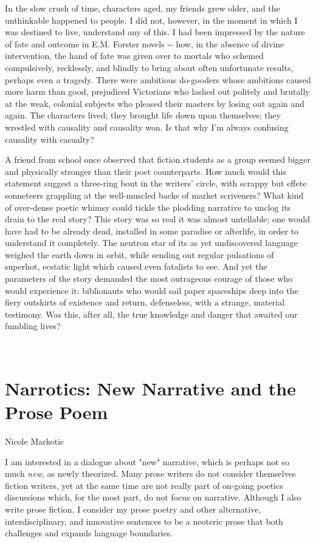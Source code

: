 In the slow crush of time, characters aged, my friends grew older, and
the unthinkable happened to people. I did not, however, in the moment in
which I was destined to live, understand any of this. I had been
impressed by the nature of fate and outcome in E.M. Forster novels -\/-
how, in the absence of divine intervention, the hand of fate was given
over to mortals who schemed compulsively, recklessly, and blindly to
bring about often unfortunate results, perhaps even a tragedy. There
were ambitious do-gooders whose ambitions caused more harm than good,
prejudiced Victorians who lashed out politely and brutally at the weak,
colonial subjects who pleased their masters by losing out again and
again. The characters lived; they brought life down upon themselves;
they wrestled with causality and causality won. Is that why I'm always
confusing causality with casualty?

A friend from school once observed that fiction students as a group
seemed bigger and physically stronger than their poet counterparts. How
much would this statement suggest a three-ring bout in the writers'
circle, with scrappy but effete sonneteers grappling at the well-muscled
backs of market scriveners? What kind of over-dense poetic whimsy could
tickle the plodding narrative to unclog its drain to the real story?
This story was so real it was almost untellable; one would have had to
be already dead, installed in some paradise or afterlife, in order to
understand it completely. The neutron star of its as yet undiscovered
language weighed the earth down in orbit, while sending out regular
pulsations of superhot, ecstatic light which caused even fatalists to
see. And yet the parameters of the story demanded the most outrageous
courage of those who would experience it: biblionauts who would sail
paper spaceships deep into the fiery outskirts of existence and return,
defenseless, with a strange, material testimony. Was this, after all,
the true knowledge and danger that awaited our fumbling lives?

~

\hypertarget{narrotics-new-narrative-and-the-prose-poem}{%
\section{Narrotics: New Narrative and the Prose
Poem}\label{narrotics-new-narrative-and-the-prose-poem}}

Nicole Markotic

I am interested in a dialogue about "new" narrative, which is perhaps
not so much \emph{new}, as newly theorized. Many prose writers do not
consider themselves fiction writers, yet at the same time are not really
part of on-going poetics discussions which, for the most part, do not
focus on narrative. Although I also write prose fiction, I consider my
prose poetry and other alternative, interdisciplinary, and innovative
sentences to be a neoteric prose that both challenges and expands
language boundaries.

